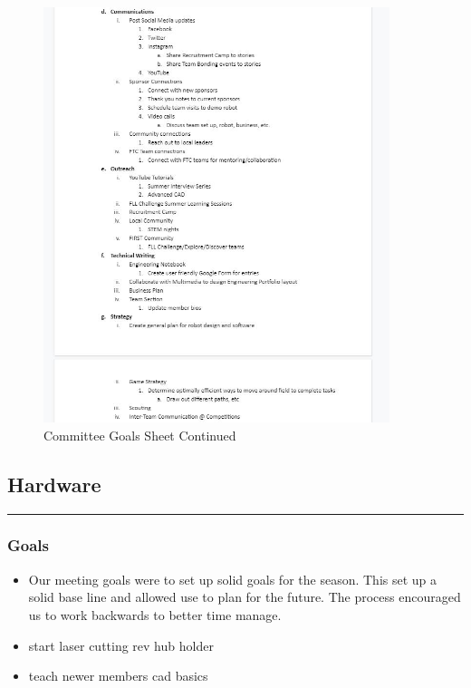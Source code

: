 \begin{figure}[htp]
\centering
\includegraphics[width=0.9\textwidth, angle=0]{Meetings/August/08-10-21/8-10-21_Image4 - Nathan Forrer.JPG}
\caption{Committee Goals Sheet Continued}
\label{fig:pic4}
\end{figure}


\subsection*{Hardware}
\noindent\hfil\rule{\textwidth}{.4pt}\hfil
\subsubsection*{Goals}
\begin{itemize}
    \item Our meeting goals were to set up solid goals for the season. This set up a solid base line and allowed use to plan for the future. The process encouraged us to work backwards to better time manage. 
    \item start laser cutting rev hub holder
	\item teach newer members cad basics

\end{itemize} 

